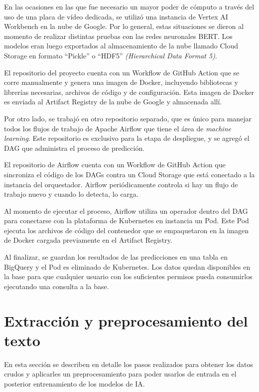 En las ocasiones en las que fue necesario un mayor poder de cómputo a través del uso de una placa de vídeo dedicada, se utilizó una instancia de Vertex AI Workbench en la nube de Google. Por lo general, estas situaciones se dieron al momento de realizar distintas pruebas con las redes neuronales BERT. Los modelos eran luego exportados al almacenamiento de la nube llamado Cloud Storage en formato ``Pickle'' o ``HDF5'' \textit{(Hierarchical Data Format 5)}.

El repositorio del proyecto cuenta con un Workflow de GitHub Action que se corre manualmente y genera una imagen de Docker, incluyendo bibliotecas y librerías necesarias, archivos de código y de configuración. Esta imagen de Docker es enviada al Artifact Registry de la nube de Google y almacenada allí.

Por otro lado, se trabajó en otro repositorio separado, que es único para manejar todos los flujos de trabajo de Apache Airflow que tiene el área de \textit{machine learning}. Este repositorio es exclusivo para la etapa de despliegue, y se agregó el DAG que administra el proceso de predicción.

El repositorio de Airflow cuenta con un Workflow de GitHub Action que sincroniza el código de los DAGs contra un Cloud Storage que está conectado a la instancia del orquestador. Airflow periódicamente controla si hay un flujo de trabajo nuevo y cuando lo detecta, lo carga.

Al momento de ejecutar el proceso, Airflow utiliza un operador dentro del DAG para conectarse con la plataforma de Kubernetes en instancia un Pod. Este Pod ejecuta los archivos de código del contenedor que se empaquetaron en la imagen de Docker cargada previamente en el Artifact Registry.

Al finalizar, se guardan los resultados de las predicciones en una tabla en BigQuery y el Pod es eliminado de Kubernetes. Los datos quedan disponibles en la base para que cualquier usuario con los suficientes permisos pueda consumirlos ejecutando una consulta a la base.

\section{Extracción y preprocesamiento del texto}

En esta sección se describen en detalle los pasos realizados para obtener los datos crudos y aplicarles un preprocesamiento para poder usarlos de entrada en el posterior entrenamiento de los modelos de IA.

